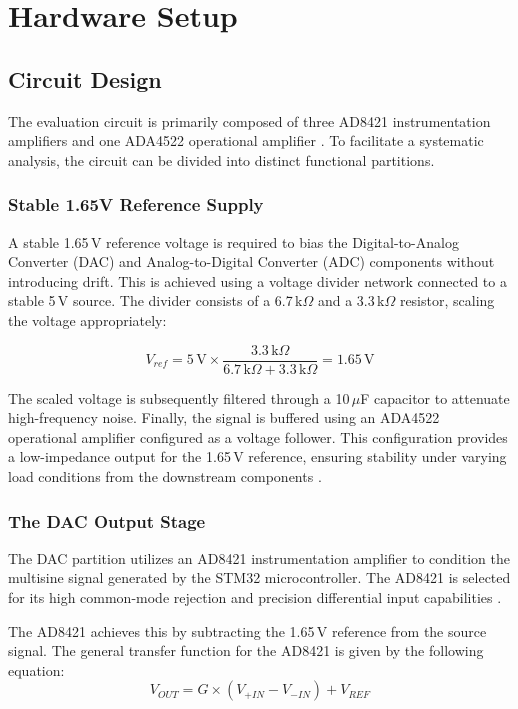 \section{Hardware Setup}

\subsection{Circuit Design}
The evaluation circuit is primarily composed of three AD8421 instrumentation amplifiers \cite{ad8421_datasheet} and one ADA4522 operational amplifier \cite{ada4522_datasheet}. To facilitate a systematic analysis, the circuit can be divided into distinct functional partitions.

\subsubsection{Stable 1.65V Reference Supply}
A stable 1.65\,V reference voltage is required to bias the Digital-to-Analog Converter (DAC) and Analog-to-Digital Converter (ADC) components without introducing drift. This is achieved using a voltage divider network connected to a stable 5\,V source. The divider consists of a 6.7\,k$\Omega$ and a 3.3\,k$\Omega$ resistor, scaling the voltage appropriately:

\begin{equation}
    V_{ref} = 5\,\text{V} \times \frac{3.3\,\text{k}\Omega}{6.7\,\text{k}\Omega + 3.3\,\text{k}\Omega} = 1.65\,\text{V}
\end{equation}

The scaled voltage is subsequently filtered through a 10\,$\mu$F capacitor to attenuate high-frequency noise. Finally, the signal is buffered using an ADA4522 operational amplifier configured as a voltage follower. This configuration provides a low-impedance output for the 1.65\,V reference, ensuring stability under varying load conditions from the downstream components \cite{ada4522_datasheet}.

\subsubsection{The DAC Output Stage}
The DAC partition utilizes an AD8421 instrumentation amplifier to condition the multisine signal generated by the STM32 microcontroller. The AD8421 is selected for its high common-mode rejection and precision differential input capabilities \cite{ad8421_datasheet}. 

The AD8421 achieves this by subtracting the 1.65\,V reference from the source signal. The general transfer function for the AD8421 is given by the following equation:
\begin{equation}
    V_{OUT} = G \times (V_{+IN} - V_{-IN}) + V_{REF}
\end{equation}

